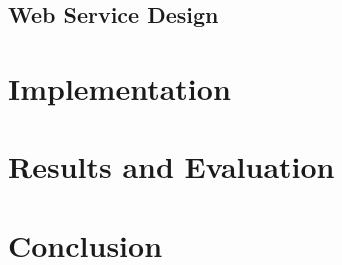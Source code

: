 \documentclass[11pt,twoside,a4paper]{article}
\begin{document}
\subsection{Web Service Design}

\section{Implementation}

\section{Results and Evaluation}

\section{Conclusion}
\end{document}
